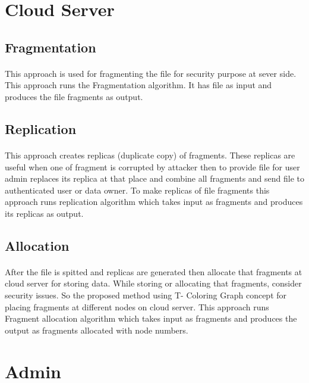 \section{Cloud Server}
\subsection{Fragmentation}
\paragraph*{}
This approach is used for fragmenting the file for security purpose at sever side. This approach runs the Fragmentation algorithm. It has file as input and produces the file fragments as output.

\subsection{Replication}
\paragraph*{}
This approach creates replicas (duplicate copy) of fragments. These replicas are useful
when one of fragment is corrupted by attacker then to provide file for user admin replaces
its replica at that place and combine all fragments and send file to authenticated user or
data owner. To make replicas of file fragments this approach runs replication algorithm
which takes input as fragments and produces its replicas as output.

\subsection{Allocation}
\paragraph*{}
After the file is spitted and replicas are generated then allocate that fragments at
cloud server for storing data. While storing or allocating that fragments, consider security
issues. So the proposed method using T- Coloring Graph concept for placing fragments
at different nodes on cloud server. This approach runs Fragment allocation algorithm
which takes input as fragments and produces the output as fragments allocated with node
numbers.

\section{Admin}
